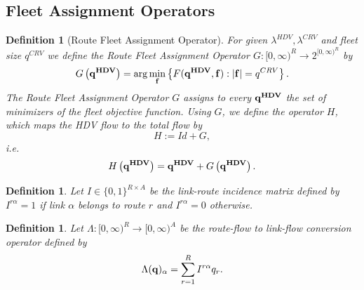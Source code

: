 \documentclass[a4paper,11pt]{article}
\newtheorem{definition}[theorem]{Definition}
\begin{document}
\subsection{\bf Fleet Assignment Operators}
\begin{definition}[Route Fleet Assignment Operator]
For given $\lambda^{HDV}, \lambda^{CRV}$ and fleet size $q^{CRV}$ we define the \emph{Route Fleet Assignment Operator} $G: [0,\infty)^R \to 2^{[0,\infty)^R}$ by
\begin{equation*}
G\left(\bold{q^{HDV}}\right) = \arg \min_{\bold{f}} \left\{F(\bold{q^{HDV}},\bold{f}): |\bold{f}| = q^{CRV}\right\}.
\end{equation*} 
The Route Fleet Assignment Operator $G$ assigns to every $\bold{q^{HDV}}$ the set of minimizers of the fleet objective function. Using $G$, we define the operator $H$, which maps the HDV flow to the total flow by 
\begin{equation*}
H := Id + G,
\end{equation*}
i.e.
\begin{equation*}
H\left(\bold{q^{HDV}}\right) = \bold{q^{HDV}} + G\left(\bold{q^{HDV}}\right).
\end{equation*}
\end{definition}

\begin{definition}
Let $I \in \{0,1\}^{R \times A}$ be the \emph {link-route incidence matrix} defined by $I^{r\alpha} = 1$ if link $\alpha$ belongs to route $r$ and $I^{r\alpha} = 0$ otherwise.
\end{definition}

\begin{definition}
Let $\Lambda : [0,\infty)^R \to [0,\infty)^A$ be the route-flow to link-flow conversion operator defined by
\begin{equation*}
\Lambda(\bold{q})_\alpha = \sum_{r=1}^R I^{r\alpha} q_r.
\end{equation*}
\end{definition}
\end{document}
